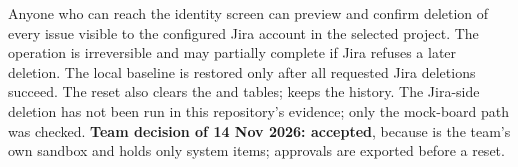 \begin{description}[leftmargin=0pt,itemsep=3pt,font=\normalfont\bfseries]
  \item[L8: Project-wide reset.] Anyone who can reach the identity screen can preview and confirm deletion of every issue visible to the configured Jira account in the selected project. The operation is irreversible and may partially complete if Jira refuses a later deletion. The local baseline is restored only after all requested Jira deletions succeed. The reset also clears the  and  tables;  keeps the history. The Jira-side deletion has not been run in this repository's evidence; only the mock-board path was checked. \textbf{Team decision of 14 Nov 2026: accepted}, because  is the team's own sandbox and holds only system items; approvals are exported before a reset.
\end{description}

